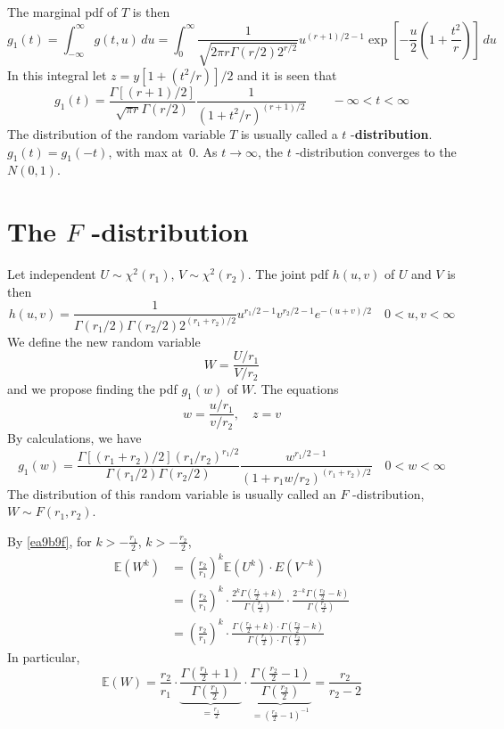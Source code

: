 The marginal pdf of $T$ is then
\[
g_1(t)=\int_{-\infty}^{\infty} g(t,u) \, du =\int_{0}^{\infty} \frac{1}{\sqrt{ 2\pi r\Gamma(r/2 )2^{r/2 } }} u^{(r+1)/2-1}\exp\left[ -\frac{u}{2}\left( 1+\frac{t^{2}}{r} \right) \right] \, du
\]
In this integral let $z=y[1+(t^{2}/r)]/2$ and it is seen that
\[
g_1(t)=\frac{\Gamma[(r+1)/2 ]}{\sqrt{ \pi r }\Gamma(r/2 )}\frac{1}{(1+t^{2}/r )^{(r+1)/2}}\qquad -\infty<t<\infty
\]
The distribution of the random variable $T$ is usually called a $t$ -\textbf{distribution}. $g_1(t)=g_1(-t)$, with max at $\,0$. As $t\to \infty$, the $t$ -distribution converges to the $N(0,1)$.

\section{The \texorpdfstring{$F$}{F} -distribution}

Let independent $U\sim \chi^{2}(r_1)$, $V\sim \chi^{2}(r_2)$. The joint pdf $h(u,v)$ of $U$ and $V$ is then
\[
h(u,v)=\frac{1}{\Gamma(r_1/2 )\Gamma(r_2 /2)2^{(r_1+r_2)/2}}u^{r_1/2 -1}v^{r_2/2-1}e^{ -(u+v)/2 }\quad 0<u,v<\infty
\]
We define the new random variable
\[
W=\frac{U/r_1}{V/r_2}
\]
and we propose finding the pdf $g_1(w)$ of $W$. The equations
\[
w=\frac{u/r_1}{v/r_2},\quad z=v
\]
By calculations, we have
\[
g_1(w)=\frac{\Gamma[(r_1+r_2)/2](r_1/r_2)^{r_1 /2}}{\Gamma(r_1/2)\Gamma(r_2/2)}\frac{w^{r_1/2-1}}{(1+r_1w/r_2 )^{(r_1+r_2)/2}}\quad 0<w<\infty
\]
The distribution of this random variable is usually called an $F$ -distribution, $W\sim F(r_1,r_2)$.

By \cref{ea9b9f}, for $k>-\frac{r_1}{2}$, $k>-\frac{r_2}{2}$,
\[
\begin{aligned}
\mathbb{E}(W^{k}) & =\left( \frac{r_2}{r_1} \right)^{k}\mathbb{E}(U^{k})\cdot E(V^{-k}) \\
 & =\left( \frac{r_2}{r_1} \right)^{k}\cdot\frac{2^{k}\Gamma\left( \frac{r_1}{2}+k \right)}{\Gamma\left( \frac{r_1}{2} \right)}\cdot\frac{2^{-k}\Gamma\left( \frac{r_2}{2}-k \right)}{\Gamma\left( \frac{r_2}{2} \right)} \\
 & =\left( \frac{r_2}{r_1} \right)^{k}\cdot\frac{\Gamma\left( \frac{r_1}{2}+k \right)\cdot\Gamma\left( \frac{r_2}{2}-k \right)}{\Gamma\left( \frac{r_1}{2} \right)\cdot\Gamma\left( \frac{r_2}{2} \right)}
\end{aligned}
\]
In particular,
\[
\mathbb{E}(W)=\frac{r_2}{r_1}\cdot\underbrace{ \frac{\Gamma\left( \frac{r_1}{2}+1 \right)}{\Gamma\left( \frac{r_1}{2} \right)} }_{ =\frac{r_1}{2} }\cdot\underbrace{ \frac{\Gamma\left( \frac{r_2}{2}-1 \right)}{\Gamma\left( \frac{r_2}{2} \right)} }_{ =\left( \frac{r_2}{2}-1 \right)^{-1} }=\frac{r_2}{r_2-2}
\]
